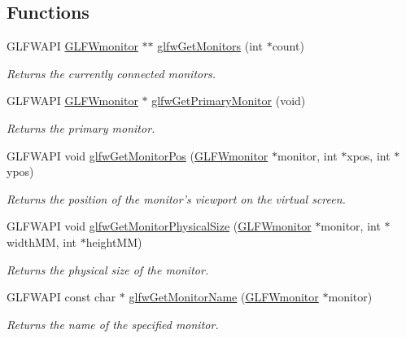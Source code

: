 \subsection*{Functions}
\begin{CompactItemize}
\item 
GLFWAPI \hyperlink{group__monitor_g8d9efd1cde9426692c73fe40437d0ae3}{GLFWmonitor} $\ast$$\ast$ \hyperlink{group__monitor_gb4d483284c57e28837bc2cd9639e9665}{glfwGetMonitors} (int $\ast$count)
\begin{CompactList}\small\item\em Returns the currently connected monitors. \item\end{CompactList}\item 
GLFWAPI \hyperlink{group__monitor_g8d9efd1cde9426692c73fe40437d0ae3}{GLFWmonitor} $\ast$ \hyperlink{group__monitor_g59ea49f377fe701dd76764183e64d9f4}{glfwGetPrimaryMonitor} (void)
\begin{CompactList}\small\item\em Returns the primary monitor. \item\end{CompactList}\item 
GLFWAPI void \hyperlink{group__monitor_g45b5481a614ad7beb2aade9746d07563}{glfwGetMonitorPos} (\hyperlink{group__monitor_g8d9efd1cde9426692c73fe40437d0ae3}{GLFWmonitor} $\ast$monitor, int $\ast$xpos, int $\ast$ypos)
\begin{CompactList}\small\item\em Returns the position of the monitor's viewport on the virtual screen. \item\end{CompactList}\item 
GLFWAPI void \hyperlink{group__monitor_gd0e93a9e42b32394369cabbbdc1ab702}{glfwGetMonitorPhysicalSize} (\hyperlink{group__monitor_g8d9efd1cde9426692c73fe40437d0ae3}{GLFWmonitor} $\ast$monitor, int $\ast$widthMM, int $\ast$heightMM)
\begin{CompactList}\small\item\em Returns the physical size of the monitor. \item\end{CompactList}\item 
GLFWAPI const char $\ast$ \hyperlink{group__monitor_g22f62011bae33ea8d2974eff5d14f9b8}{glfwGetMonitorName} (\hyperlink{group__monitor_g8d9efd1cde9426692c73fe40437d0ae3}{GLFWmonitor} $\ast$monitor)
\begin{CompactList}\small\item\em Returns the name of the specified monitor. \item\end{CompactList}\item 
$$
\end{CompactItemize}

